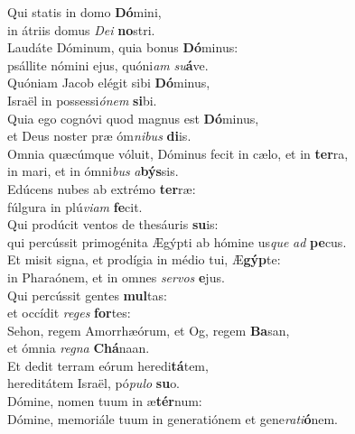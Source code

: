 \evenverse Qui statis in domo \textbf{Dó}mini,~\*\\
\evenverse in átriis domus \textit{De}\textit{i} \textbf{no}stri.\\
\oddverse Laudáte Dóminum, quia bonus \textbf{Dó}minus:~\*\\
\oddverse psállite nómini ejus, quóni\textit{am} \textit{su}\textbf{á}ve.\\
\evenverse Quóniam Jacob elégit sibi \textbf{Dó}minus,~\*\\
\evenverse Israël in possessi\textit{ó}\textit{nem} \textbf{si}bi.\\
\oddverse Quia ego cognóvi quod magnus est \textbf{Dó}minus,~\*\\
\oddverse et Deus noster præ óm\textit{ni}\textit{bus} \textbf{di}is.\\
\evenverse Omnia quæcúmque vóluit, Dóminus fecit in cælo, et in \textbf{ter}ra,~\*\\
\evenverse in mari, et in ómni\textit{bus} \textit{a}\textbf{býs}sis.\\
\oddverse Edúcens nubes ab extrémo \textbf{ter}ræ:~\*\\
\oddverse fúlgura in plú\textit{vi}\textit{am} \textbf{fe}cit.\\
\evenverse Qui prodúcit ventos de thesáuris \textbf{su}is:~\*\\
\evenverse qui percússit primogénita Ægýpti ab hómine us\textit{que} \textit{ad} \textbf{pe}cus.\\
\oddverse Et misit signa, et prodígia in médio tui, Æ\textbf{gýp}te:~\*\\
\oddverse in Pharaónem, et in omnes \textit{ser}\textit{vos} \textbf{e}jus.\\
\evenverse Qui percússit gentes \textbf{mul}tas:~\*\\
\evenverse et occídit \textit{re}\textit{ges} \textbf{for}tes:\\
\oddverse Sehon, regem Amorrhæórum, et Og, regem \textbf{Ba}san,~\*\\
\oddverse et ómnia \textit{re}\textit{gna} \textbf{Chá}naan.\\
\evenverse Et dedit terram eórum heredi\textbf{tá}tem,~\*\\
\evenverse hereditátem Israël, pó\textit{pu}\textit{lo} \textbf{su}o.\\
\oddverse Dómine, nomen tuum in æ\textbf{tér}num:~\*\\
\oddverse Dómine, memoriále tuum in generatiónem et gene\textit{ra}\textit{ti}\textbf{ó}nem.\\
